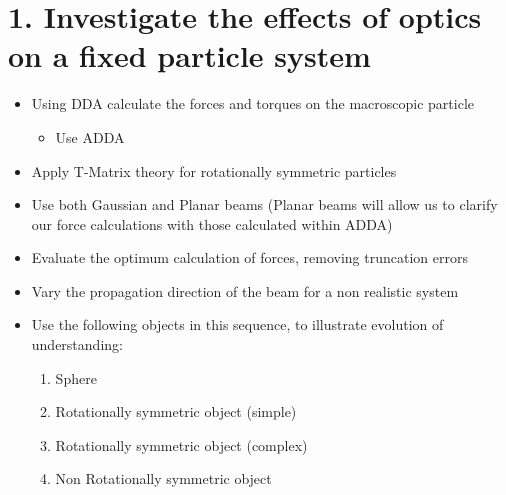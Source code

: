 \documentclass[11pt]{meetingmins}
\begin{document}
\maketitle

\section{1. Investigate the effects of optics on a fixed particle system}

\begin{itemize}

\item Using DDA calculate the forces and torques on the macroscopic particle

\begin{itemize}

\item Use ADDA

\end{itemize}

\item Apply T-Matrix theory for rotationally symmetric particles

\item Use both Gaussian and Planar beams (Planar beams will allow us to clarify our force calculations with those calculated within ADDA)

\item Evaluate the optimum calculation of forces, removing truncation errors

\item Vary the propagation direction of the beam for a non realistic system

\item Use the following objects in this sequence, to illustrate evolution of understanding:

\begin{enumerate}

\item Sphere

\item Rotationally symmetric object (simple)

\item Rotationally symmetric object (complex)

\item Non Rotationally symmetric object

\end{enumerate}

\end{itemize}
\end{document}
